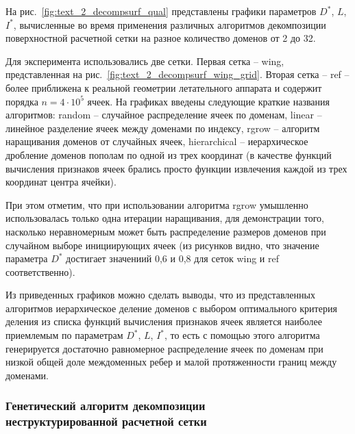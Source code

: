 На рис.~\ref{fig:text_2_decompsurf_qual} представлены графики параметров $D^{*}$, $L$, $I^{*}$, вычисленные во время применения различных алгоритмов декомпозиции поверхностной расчетной сетки на разное количество доменов от 2 до 32.

Для эксперимента использовались две сетки.
Первая сетка -- wing, представленная на рис.~\ref{fig:text_2_decompsurf_wing_grid}.
Вторая сетка -- ref -- более приближена к реальной геометрии летательного аппарата и содержит порядка $n = 4 \cdot 10^5$ ячеек.
На графиках введены следующие краткие названия алгоритмов: random -- случайное распределение ячеек по доменам\label{term:alg_decomp_random2}, linear -- линейное разделение ячеек между доменами по индексу\label{term:alg_decomp_linear2}, rgrow -- алгоритм наращивания доменов от случайных ячеек\label{term:alg_decomp_rgrow2}, hierarchical -- иерархическое дробление доменов\label{term:alg_decomp_hierarch2} пополам по одной из трех координат (в качестве функций вычисления признаков ячеек брались просто функции извлечения каждой из трех координат центра ячейки).

При этом отметим, что при использовании алгоритма rgrow умышленно использовалась только одна итерации наращивания, для демонстрации того, насколько неравномерным может быть распределение размеров доменов при случайном выборе инициирующих ячеек (из рисунков видно, что значение параметра $D^{*}$\label{term:decomp_neravn4} достигает значениий 0,6 и 0,8 для сеток wing и ref соответственно).

Из приведенных графиков можно сделать выводы, что из представленных алгоритмов иерархическое деление доменов с выбором оптимального критерия деления из списка функций вычисления признаков ячеек является наиболее приемлемым по параметрам $D^{*}$, $L$,\label{term:decomp_maxbord3} $I^{*}$,\label{term:decomp_sumbord3} то есть с помощью этого алгоритма генерируется достаточно равномерное распределение ячеек по доменам при низкой общей доле междоменных ребер и малой протяженности границ между доменами.

\subsubsection{Генетический алгоритм декомпозиции \\ неструктурированной расчетной сетки}\label{sec:text_2_genetic}

